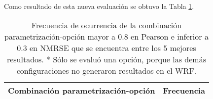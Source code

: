 \begin{itemize}



Como resultado de esta nueva evaluación se obtuvo la Tabla \ref{tabla_mejores_param_opciones_2}.\\
\begin{table}[H]
\caption{Frecuencia de ocurrencia de la combinación parametrización-opción mayor a 0.8 en Pearson e inferior a 0.3 en NMRSE que se encuentra entre los 5 mejores resultados. * Sólo se evaluó una opción, porque las demás configuraciones no generaron resultados en el WRF.}
\label{tabla_mejores_param_opciones_2}
\centering
\begin{tabular}{lr}
\toprule
Combinación parametrización-opción               & Frecuencia       \\
\midrule


\end{tabular}
\end{table}
\end{itemize}

